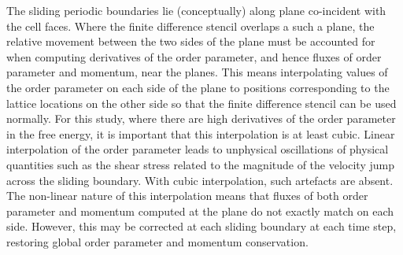 \documentclass[8.5pt,twoside,twocolumn]{article}
\begin{document}
The sliding periodic boundaries lie (conceptually) along plane
co-incident with the cell faces. Where the finite difference stencil 
overlaps a such a plane, the relative movement between the two sides
of the plane must be accounted for when computing derivatives of the
order parameter, and hence fluxes of order parameter and momentum,
near the planes. This means interpolating values of the order parameter
on each side of the plane to positions corresponding to the lattice
locations on the other side so that the finite difference stencil
can be used normally. For this study, where there are high derivatives
of the order parameter in the free energy, it is important that this
interpolation is at least cubic. Linear interpolation of the order
parameter leads to unphysical oscillations of physical quantities
such as the shear stress related to the magnitude of the velocity jump
across the sliding boundary.
With cubic interpolation, such artefacts are absent. The non-linear
nature of this interpolation means that fluxes of both order parameter
and momentum computed at the plane do not exactly match on each side.
However, this may be corrected at each sliding boundary at each time
step, restoring global order parameter and momentum conservation.



\footnotesize{
}
\end{document}
